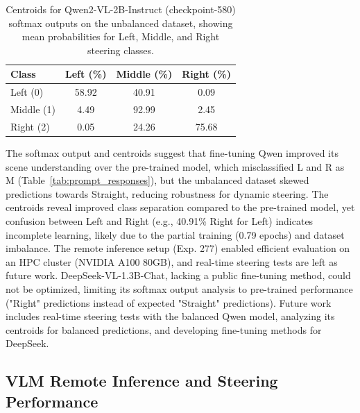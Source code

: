 \begin{table}[ht]
\centering
\begin{tabular}{@{}lccc@{}}
\toprule
Class & Left (\%) & Middle (\%) & Right (\%) \\
\midrule
Left (0) & 58.92 & 40.91 & 0.09 \\
Middle (1) & 4.49 & 92.99 & 2.45 \\
Right (2) & 0.05 & 24.26 & 75.68 \\
\bottomrule
\end{tabular}
\caption{Centroids for Qwen2-VL-2B-Instruct (checkpoint-580) softmax outputs on the unbalanced dataset, showing mean probabilities for Left, Middle, and Right steering classes.}
\label{tab:qwen_centroids}
\end{table}

The softmax output and centroids suggest that fine-tuning Qwen improved its scene understanding over the pre-trained model, which misclassified L and R as M (Table~\ref{tab:prompt_responses}), but the unbalanced dataset skewed predictions towards Straight, reducing robustness for dynamic steering. The centroids reveal improved class separation compared to the pre-trained model, yet confusion between Left and Right (e.g., 40.91\% Right for Left) indicates incomplete learning, likely due to the partial training (0.79 epochs) and dataset imbalance. The remote inference setup (Exp. 277) enabled efficient evaluation on an HPC cluster (NVIDIA A100 80GB), and real-time steering tests are left as future work. DeepSeek-VL-1.3B-Chat, lacking a public fine-tuning method, could not be optimized, limiting its softmax output analysis to pre-trained performance ("Right" predictions instead of expected "Straight" predictions).
Future work includes real-time steering tests with the balanced Qwen model, analyzing its centroids for balanced predictions, and developing fine-tuning methods for DeepSeek.

\subsection{VLM Remote Inference and Steering Performance}
\label{subsec:vlm_remote_inference}

